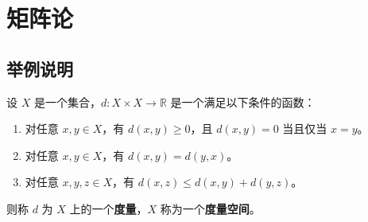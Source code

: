 \documentclass[12pt, a4paper, oneside, UTF8]{ctexbook}
\begin{document}
	\else
	\fi
	
	\chapter{矩阵论}
	
	\section{举例说明}
	
	\begin{defn}
		设 $X$ 是一个集合，$d: X \times X \to \mathbb{R}$ 是一个满足以下条件的函数：
		\begin{enumerate}
			\item 对任意 $x, y \in X$，有 $d(x, y) \geq 0$，且 $d(x, y) = 0$ 当且仅当 $x = y$。
			\item 对任意 $x, y \in X$，有 $d(x, y) = d(y, x)$。
			\item 对任意 $x, y, z \in X$，有 $d(x, z) \leq d(x, y) + d(y, z)$。
		\end{enumerate}
		则称 $d$ 为 $X$ 上的一个\textbf{度量}，$X$ 称为一个\textbf{度量空间}。
	\end{defn}
	
	\ifx\allfiles\undefined
\end{document}
